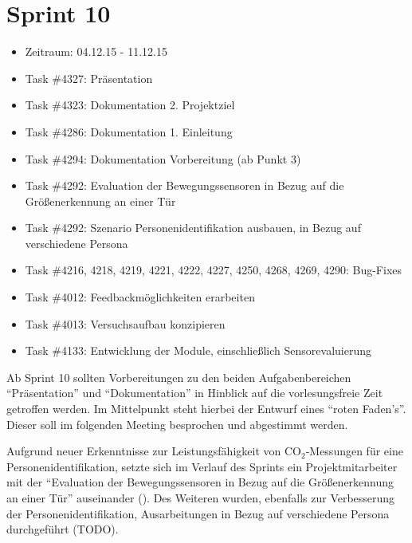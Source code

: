 \documentclass[12pt, oneside, smallheadings]{scrbook}
\begin{document}
\section{Sprint 10}
\begin{itemize}
	\item Zeitraum: 04.12.15 - 11.12.15 \newline
	\item Task \#4327: Präsentation
	\item Task \#4323: Dokumentation 2. Projektziel
	\item Task \#4286: Dokumentation 1. Einleitung
	\item Task \#4294: Dokumentation Vorbereitung (ab Punkt 3)
	\item Task \#4292: Evaluation der Bewegungssensoren in Bezug auf die Größenerkennung an einer Tür
	\item Task \#4292: Szenario Personenidentifikation ausbauen, in Bezug auf verschiedene Persona
	\item Task \#4216, 4218, 4219, 4221, 4222, 4227, 4250, 4268, 4269, 4290: Bug-Fixes
	\item Task \#4012: Feedbackmöglichkeiten erarbeiten
	\item Task \#4013: Versuchsaufbau konzipieren
	\item Task \#4133: Entwicklung der Module, einschließlich Sensorevaluierung\\
\end{itemize}
\noindent
Ab Sprint 10 sollten Vorbereitungen zu den beiden Aufgabenbereichen "`Präsentation"' und "`Dokumentation"' in Hinblick auf die vorlesungsfreie Zeit getroffen werden. Im Mittelpunkt steht hierbei der Entwurf eines "`roten Faden's"'. Dieser soll im folgenden Meeting besprochen und abgestimmt werden.

Aufgrund neuer Erkenntnisse zur Leistungsfähigkeit von CO$_2$-Messungen für eine Personenidentifikation, setzte sich im Verlauf des Sprints ein Projektmitarbeiter mit der "`Evaluation der Bewegungssensoren in Bezug auf die Größenerkennung an einer Tür"' auseinander (). Des Weiteren wurden, ebenfalls zur Verbesserung der Personenidentifikation, Ausarbeitungen in Bezug auf verschiedene Persona durchgeführt (TODO).
\end{document}
